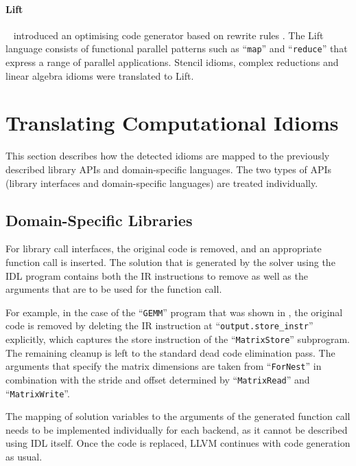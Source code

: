     \paragraph*{Lift}~\citet{steuwer15rewrite} introduced an optimising code
    generator based on rewrite rules \citep{SteuwerRD17, HagedornSSGD18}.
    The Lift language consists of functional parallel patterns such as
    ``{\tt map}'' and ``{\tt reduce}'' that  express a range of parallel
    applications.
    Stencil idioms, complex reductions and linear algebra idioms were translated
    to Lift.

\section{Translating Computational Idioms}

    This section describes how the detected idioms are mapped to the previously
    described library APIs and domain-specific languages.
    The two types of APIs (library interfaces and domain-specific languages) are
    treated individually.

\subsection{Domain-Specific Libraries}

    For library call interfaces, the original code is removed, and an
    appropriate function call is inserted.
    The solution that is generated by the solver using the IDL program contains
    both the IR instructions to remove as well as the arguments that are to be
    used for the function call.

    For example, in the case of the ``{\tt GEMM}'' program that was shown in
    , the original code is removed by deleting the IR
    instruction at ``{\tt output.store\_instr}'' explicitly, which captures the
    store instruction of the ``{\tt MatrixStore}'' subprogram.
    The remaining cleanup is left to the standard dead code elimination
    pass.
    The arguments that specify the matrix dimensions are taken from
    ``{\tt ForNest}'' in combination with the stride and offset determined by
    ``{\tt MatrixRead}'' and ``{\tt MatrixWrite}''.

    The mapping of solution variables to the arguments of the generated function
    call needs to be implemented individually for each backend, as it cannot be
    described using IDL itself.
    Once the code is replaced, LLVM continues with code generation as usual.

